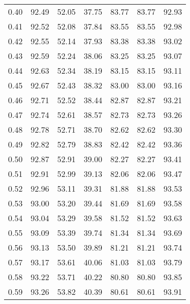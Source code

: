 \begin{tabular}{|c|c|c|c|c|c|c|}
      0.40 &     92.49 &     52.05 &      37.75 &   83.77 &      83.77 &         92.93 \\
      0.41 &     92.52 &     52.08 &      37.84 &   83.55 &      83.55 &         92.98 \\
      0.42 &     92.55 &     52.14 &      37.93 &   83.38 &      83.38 &         93.02 \\
      0.43 &     92.59 &     52.24 &      38.06 &   83.25 &      83.25 &         93.07 \\
      0.44 &     92.63 &     52.34 &      38.19 &   83.15 &      83.15 &         93.11 \\
      0.45 &     92.67 &     52.43 &      38.32 &   83.00 &      83.00 &         93.16 \\
      0.46 &     92.71 &     52.52 &      38.44 &   82.87 &      82.87 &         93.21 \\
      0.47 &     92.74 &     52.61 &      38.57 &   82.73 &      82.73 &         93.26 \\
      0.48 &     92.78 &     52.71 &      38.70 &   82.62 &      82.62 &         93.30 \\
      0.49 &     92.82 &     52.79 &      38.83 &   82.42 &      82.42 &         93.36 \\
      0.50 &     92.87 &     52.91 &      39.00 &   82.27 &      82.27 &         93.41 \\
      0.51 &     92.91 &     52.99 &      39.13 &   82.06 &      82.06 &         93.47 \\
      0.52 &     92.96 &     53.11 &      39.31 &   81.88 &      81.88 &         93.53 \\
      0.53 &     93.00 &     53.20 &      39.44 &   81.69 &      81.69 &         93.58 \\
      0.54 &     93.04 &     53.29 &      39.58 &   81.52 &      81.52 &         93.63 \\
      0.55 &     93.09 &     53.39 &      39.74 &   81.34 &      81.34 &         93.69 \\
      0.56 &     93.13 &     53.50 &      39.89 &   81.21 &      81.21 &         93.74 \\
      0.57 &     93.17 &     53.61 &      40.06 &   81.03 &      81.03 &         93.79 \\
      0.58 &     93.22 &     53.71 &      40.22 &   80.80 &      80.80 &         93.85 \\
      0.59 &     93.26 &     53.82 &      40.39 &   80.61 &      80.61 &         93.91 \\

\end{tabular}
